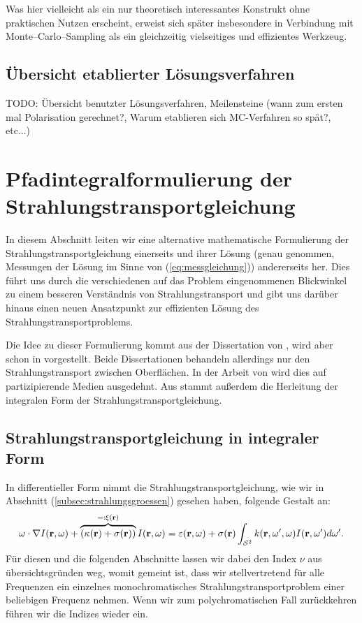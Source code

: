 	Was hier vielleicht als ein nur theoretisch interessantes Konstrukt ohne praktischen Nutzen erscheint, erweist sich später insbesondere in Verbindung mit Monte--Carlo--Sampling als ein gleichzeitig vielseitiges und effizientes Werkzeug.	
	
	
	\section{Übersicht etablierter Lösungsverfahren}
	TODO: Übersicht benutzter Lösungsverfahren, Meilensteine (wann zum ersten mal Polarisation gerechnet?, Warum etablieren sich MC-Verfahren so spät?, etc...)
		
	\chapter{Pfadintegralformulierung der Strahlungstransportgleichung}\label{chapter:path_radiative_transfer}
	In diesem Abschnitt leiten wir eine alternative mathematische Formulierung der Strahlungstransportgleichung einerseits und ihrer Lösung (genau genommen, Messungen der Lösung im Sinne von (\ref{eq:messgleichung})) andererseits her. Dies führt uns durch die verschiedenen auf das Problem eingenommenen Blickwinkel zu einem besseren Verständnis von Strahlungstransport und gibt uns darüber hinaus einen neuen Ansatzpunkt zur effizienten Lösung des Strahlungstransportproblems.
	
	Die Idee zu dieser Formulierung kommt aus der Dissertation von \citet{Veach:1997p9136}, wird aber schon in \citep{Arvo:1995p9257} vorgestellt. Beide Dissertationen behandeln allerdings nur den Strahlungstransport zwischen Oberflächen. In der Arbeit von \citet{Pauly:2000p5705} wird dies auf partizipierende Medien ausgedehnt. Aus \citep{Arvo:1993p9035} stammt außerdem die Herleitung der integralen Form der Strahlungstransportgleichung.
	
	
	\section{Strahlungstransportgleichung in integraler Form}
	In differentieller Form nimmt die Strahlungstransportgleichung, wie wir in Abschnitt (\ref{subsec:strahlungsgroessen}) gesehen haben, folgende Gestalt an:
		\begin{equation}
			\omega \cdot \nabla I(\mathbf{r},\omega)+\overbrace{\left(\kappa(\mathbf{r})+\sigma(\mathbf{r})\right)}^{=:\xi(\mathbf{r})}I(\mathbf{r},\omega)=\varepsilon(\mathbf{r},\omega)+\sigma(\mathbf{r}) \int_{\mathcal{S}^2} k(\mathbf{r},\omega',\omega)I(\mathbf{r},\omega') d\omega'.
			\label{eq:diff.STG}
		\end{equation}
	Für diesen und die folgenden Abschnitte lassen wir dabei den Index $\nu$ aus übersichtsgründen weg, womit gemeint ist, dass wir stellvertretend für alle Frequenzen ein einzelnes monochromatisches Strahlungstransportproblem einer beliebigen Frequenz nehmen. Wenn wir zum polychromatischen Fall zurückkehren führen wir die Indizes wieder ein.
	
